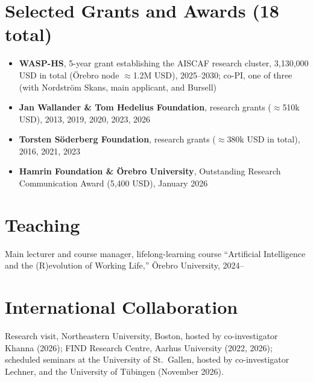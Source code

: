 \documentclass[11pt,a4paper]{article}
\newcommand{\cventry}[1]{\item #1}
\newcommand{\sectioncount}[1]{\textcolor{countgray}{\normalfont(#1)}}
\begin{document}
\section{Selected Grants and Awards \sectioncount{18 total}}
\vspace{-2pt}
\begin{itemize}
\cventry{\textbf{WASP-HS}, 5-year grant establishing the AISCAF research cluster, 3,130,000 USD in total (Örebro node $\approx$1.2M USD), 2025--2030; co-PI, one of three (with Nordström Skans, main applicant, and Bursell)} %
\cventry{\textbf{Jan Wallander \& Tom Hedelius Foundation}, research grants ($\approx$510k USD), 2013, 2019, 2020, 2023, 2026} %
\cventry{\textbf{Torsten Söderberg Foundation}, research grants ($\approx$380k USD in total), 2016, 2021, 2023} %
\cventry{\textbf{Hamrin Foundation \& Örebro University}, Outstanding Research Communication Award (5,400 USD), January 2026}
\end{itemize}

\section{Teaching}
\vspace{-2pt}
Main lecturer and course manager, lifelong-learning course ``Artificial Intelligence and the (R)evolution of Working Life,'' Örebro University, 2024--

\section{International Collaboration}
\vspace{-2pt}
Research visit, Northeastern University, Boston, hosted by co-investigator Khanna (2026); FIND Research Centre, Aarhus University (2022, 2026); scheduled seminars at the University of St.\ Gallen, hosted by co-investigator Lechner, and the University of Tübingen (November 2026).

\end{document}
